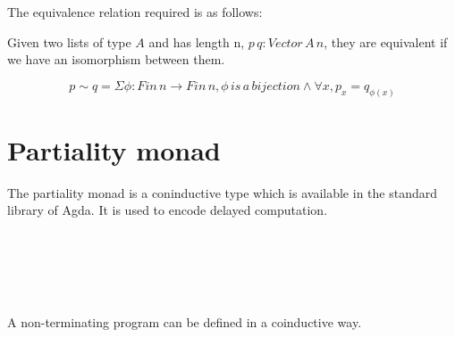 The equivalence relation required is as follows:

Given two lists of type $A$ and has length n, $p \, q : Vector\,A\,n$,
they are equivalent if we have an isomorphism between them.

$$ p \sim q = \Sigma \phi : Fin\,n \rightarrow Fin\,n, \phi\,is\,a\,
bijection \wedge \forall x, p_x = q_{\phi(x)}$$





\section{Partiality monad}

The partiality monad is a coninductive type which is available in the
standard library of Agda. It is used to encode delayed computation.

\begin{code}
\\
\>  \AgdaSymbol{(} \AgdaSymbol{:} \AgdaSymbol{)} \AgdaSymbol{:}  \<%
\\
\>[0]\<[2]%
\>[2] \AgdaSymbol{:}    \<%
\\
\>[0]\<[2]%
\>[2] \AgdaSymbol{:}  \AgdaSymbol{(} \AgdaSymbol{)}   \<%
\\
\end{code}

A non-terminating program can be defined in a coinductive way.

\begin{code}
\\
\> \AgdaSymbol{:} \AgdaSymbol{\{} \AgdaSymbol{:} \AgdaSymbol{\}}   \<%
\\
\> \AgdaSymbol{=}  \AgdaSymbol{(} \AgdaSymbol{)}\<%
\\
\end{code}

